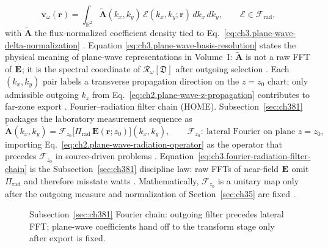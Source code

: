 \begin{equation}
\label{eq:ch3.plane-wave-basis-resolution}
\mathbf{v}_\omega(\mathbf{r})
=
\int_{\mathbb{R}^{2}}
\widetilde{\mathbf{A}}(k_{x},k_{y})\,
\boldsymbol{\mathcal{E}}(k_{x},k_{y};\mathbf{r})\,dk_{x}\,dk_{y},
\qquad
\boldsymbol{\mathcal{E}}\in\mathcal{F}_{\mathrm{rad}},
\end{equation}
with \(\widetilde{\mathbf{A}}\) the flux-normalized coefficient density tied to
Eq.~\eqref{eq:ch3.plane-wave-delta-normalization} \cite{stratton1941}. Equation
\eqref{eq:ch3.plane-wave-basis-resolution} states the physical meaning of plane-wave representations in Volume~I:
\(\widetilde{\mathbf{A}}\) is not a raw FFT of \(\mathbf{E}\); it is the spectral coordinate of
\(\mathcal{R}_\omega[\mathfrak{D}]\) after outgoing selection \cite{harrington2001}. Each
\((k_{x},k_{y})\) pair labels a transverse propagation direction on the \(z=z_{0}\) chart; only admissible outgoing
\(k_{z}\) from Eq.~\eqref{eq:ch2.plane-wave-z-propagation} contributes to far-zone export \cite{jackson1999}.
Fourier--radiation filter chain (HOME). Subsection~\ref{sec:ch381} packages the laboratory measurement sequence as
\begin{equation}
\label{eq:ch3.fourier-radiation-filter-chain}
\widetilde{\mathbf{A}}(k_{x},k_{y})
=
\mathcal{F}_{z_{0}}\bigl[\Pi_{\mathrm{rad}}\,\mathbf{E}(\mathbf{r};z_{0})\bigr](k_{x},k_{y}),
\qquad
\mathcal{F}_{z_{0}}:\ \text{lateral Fourier on plane }z=z_{0},
\end{equation}
importing Eq.~\eqref{eq:ch2.plane-wave-radiation-operator} as the operator that precedes \(\mathcal{F}_{z_{0}}\) in source-driven
problems \cite{stratton1941}. Equation~\eqref{eq:ch3.fourier-radiation-filter-chain} is the Subsection~\ref{sec:ch381}
discipline law: raw FFTs of near-field \(\mathbf{E}\) omit \(\Pi_{\mathrm{rad}}\) and therefore misstate watts
\cite{harrington2001}. Mathematically, \(\mathcal{F}_{z_{0}}\) is a unitary map only after the outgoing
measure and normalization of Section~\ref{sec:ch35} are fixed \cite{hansen1988}.
\begin{figure}[t]
\centering
{}
\caption{Subsection~\ref{sec:ch381} Fourier chain: outgoing filter precedes lateral FFT; plane-wave coefficients hand off to the
transform stage only after export is fixed.}
\label{fig:ch3.381-fourier-chain}
\end{figure}
